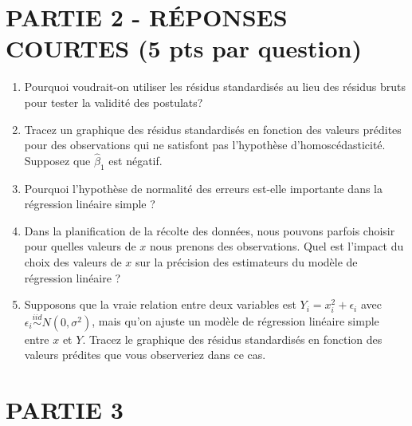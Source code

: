\documentclass[a4paper, 11pt]{article}
\begin{document}
{\section*{PARTIE 2 - RÉPONSES COURTES (5 pts par question)}
\vspace{0.1 in}
\begin{enumerate}
\item Pourquoi voudrait-on utiliser les résidus standardisés au lieu des résidus bruts pour tester la validité des postulats?
\vspace{1.2 in }
\item Tracez un graphique des résidus standardisés en fonction des valeurs prédites pour des observations qui ne satisfont pas l'hypothèse d'homoscédasticité. Supposez que $\hat{\beta}_1$ est négatif.
\vspace{1.5 in }
\item Pourquoi l'hypothèse de normalité des erreurs est-elle importante dans la régression linéaire simple ?
\vspace{1.2 in }
\item Dans la planification de la récolte des données, nous pouvons parfois choisir pour quelles valeurs de $x$ nous prenons des observations. Quel est l'impact du choix des valeurs de $x$ sur la précision des estimateurs du modèle de régression linéaire ?
\vspace{1.2 in }
\item Supposons que la vraie relation entre deux variables est $Y_i = x_i^2 + \epsilon_i$ avec $\epsilon_i \overset{iid}{\sim} N(0,\sigma^2)$, mais qu'on ajuste un modèle de régression linéaire simple entre $x$ et $Y$. Tracez le graphique des résidus standardisés en fonction des valeurs prédites que vous observeriez dans ce cas. 





\end{enumerate}


\newpage 


\section*{PARTIE 3}

\begin{enumerate}



\end{enumerate}}
\end{document}
